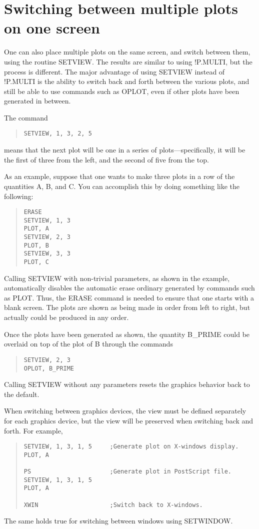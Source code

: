 \section{Switching between multiple plots on one screen}

One can also place multiple plots on the same screen, and switch between
them, using the routine SETVIEW.  The results are similar to using !P.MULTI,
but the process is different.  The major advantage of using SETVIEW instead of
!P.MULTI is the ability to switch back and forth between the various plots, and
still be able to use commands such as OPLOT, even if other plots have been
generated in between.

The command
\begin{quote}
\begin{verbatim}
SETVIEW, 1, 3, 2, 5
\end{verbatim}
\end{quote}
means that the next plot will be one in a series of plots---specifically, it
will be the first of three from the left, and the second of five from the top.

As an example, suppose that one wants to make three plots in a row of the
quantities A, B, and C.  You can accomplish this by doing something like the
following:
\begin{quote}
\begin{verbatim}
ERASE
SETVIEW, 1, 3
PLOT, A
SETVIEW, 2, 3
PLOT, B
SETVIEW, 3, 3
PLOT, C
\end{verbatim}
\end{quote}
Calling SETVIEW with non-trivial parameters, as shown in the example,
automatically disables the automatic erase ordinary generated by commands such
as PLOT.  Thus, the ERASE command is needed to ensure that one starts with a
blank screen.  The plots are shown as being made in order from left to right,
but actually could be produced in any order.

Once the plots have been generated as shown, the quantity B\_PRIME could be
overlaid on top of the plot of B through the commands
\begin{quote}
\begin{verbatim}
SETVIEW, 2, 3
OPLOT, B_PRIME
\end{verbatim}
\end{quote}

Calling SETVIEW without any parameters resets the graphics behavior back to the
default.

When switching between graphics devices, the view must be defined separately
for each graphics device, but the view will be preserved when switching back
and forth.  For example,
\begin{quote}
\begin{verbatim}
SETVIEW, 1, 3, 1, 5     ;Generate plot on X-windows display.
PLOT, A

PS                      ;Generate plot in PostScript file.
SETVIEW, 1, 3, 1, 5
PLOT, A

XWIN                    ;Switch back to X-windows.
\end{verbatim}
\end{quote}
The same holds true for switching between windows using SETWINDOW.


